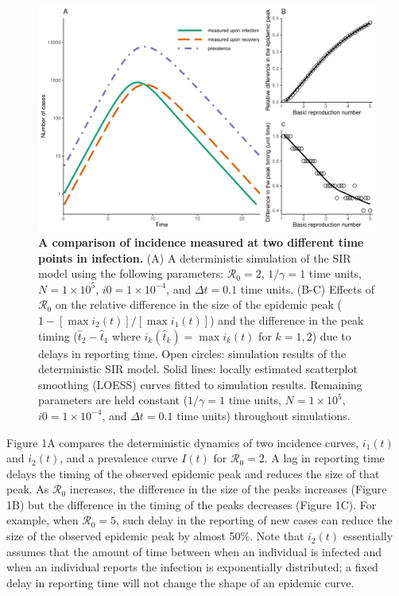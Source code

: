 \documentclass[12pt]{article}\usepackage[]{graphicx}\usepackage[]{color}
\begin{document}
\begin{figure}[!t]
\includegraphics[width=\textwidth]{../figure/example.pdf}
\caption{
\textbf{A comparison of incidence measured at two different time points in infection.}
(A) 
A deterministic simulation of the SIR model using the following parameters: 
$\mathcal R_0 = 2$, $1/\gamma = 1$ time units, $N = 1 \times 10^5$, $i0 = 1 \times 10^{-4}$,
and $\Delta t = 0.1$ time units.
(B-C) Effects of $\mathcal R_0$ on the relative difference in the size of the epidemic peak ($1 - [\max i_2(t)]/[\max i_1(t)]$) and the difference in the peak timing ($\hat{t}_2 - \hat{t}_1$ where $i_k(\hat{t}_k) = \max i_k(t)$ for $k = 1, 2$) due to delays in reporting time.
Open circles: simulation results of the deterministic SIR model.
Solid lines: locally estimated scatterplot smoothing (LOESS) curves fitted to simulation results.
Remaining parameters are held constant ($1/\gamma = 1$ time units, $N = 1 \times 10^5$, $i0 = 1 \times 10^{-4}$, and $\Delta t = 0.1$ time units) throughout simulations.
}
\end{figure}

Figure 1A compares the deterministic dynamics of two incidence curves,
$i_1(t)$ and $i_2(t)$, and a prevalence curve $I(t)$ for $\mathcal R_0 = 2$. 
A lag in reporting time delays
the timing of the observed epidemic peak and reduces the size of that peak.
As $\mathcal R_0$ increases, the difference in the size of the peaks increases (Figure 1B)
but the difference in the timing of the peaks decreases (Figure 1C).
For example, when $\mathcal R_0 = 5$, such delay in the reporting of new cases can reduce the size of the observed epidemic peak by almost 50\%.
Note that $i_2(t)$ essentially assumes that the amount of time between when an individual is infected and when an individual reports the infection is exponentially distributed; a fixed delay in reporting time will not change the shape of an epidemic curve.
\end{document}
